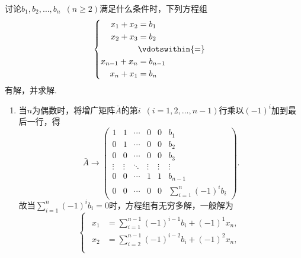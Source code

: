 \begin{exercise}
\begin{exgroup}
        \item 讨论$b_1,b_2,\ldots,b_n\enspace(n \geqslant 2)$满足什么条件时，下列方程组
        \[\begin{cases} \begin{aligned}
                    x_1+x_2     & =b_1            \\
                    x_2+x_3     & =b_2            \\
                                & \vdotswithin{=} \\
                    x_{n-1}+x_n & =b_{n-1}        \\
                    x_n+x_1     & =b_n
                \end{aligned} \end{cases}\]有解，并求解.
        \begin{answer}
            \begin{enumerate}
                \item 当$n$为偶数时，将增广矩阵$\bar{A}$的第$i\enspace(i=1,2,\ldots,n-1)$行乘以$(-1)^i$加到最后一行，得
                      \[ \bar{A}\rightarrow\begin{pmatrix}
                              1      & 1      & \cdots & 0      & 0      & b_1                                  \\
                              0      & 1      & \cdots & 0      & 0      & b_2                                  \\
                              0      & 0      & \cdots & 0      & 0      & b_3                                  \\
                              \vdots & \vdots & \ddots & \vdots & \vdots & \vdots                               \\
                              0      & 0      & \cdots & 1      & 1      & b_{n-1}                              \\
                              0      & 0      & \cdots & 0      & 0      & \displaystyle\sum_{i=1}^{n}(-1)^ib_i
                          \end{pmatrix}. \]
                      故当$\displaystyle\sum_{i=1}^{n}(-1)^ib_i=0$时，方程组有无穷多解，一般解为
                      \[\begin{cases} \begin{aligned}
                                  x_1     & =\displaystyle\sum_{i=1}^{n-1}(-1)^{i-1}b_i+(-1)^1x_n, \\
                                  x_2     & =\displaystyle\sum_{i=2}^{n-1}(-1)^{i-2}b_i+(-1)^2x_n, \\

\end{aligned}
\end{cases}\]
\end{enumerate}
\end{answer}
\end{exgroup}
\end{exercise}

